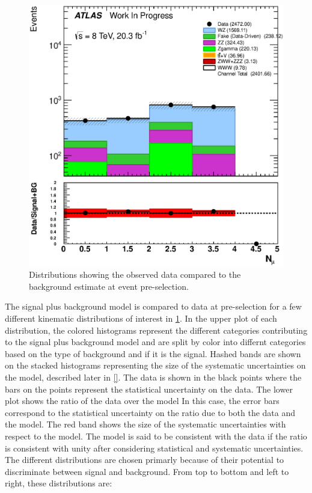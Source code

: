 \begin{figure}[ht!]
\includegraphics[width=0.3\columnwidth]{figures/appendix_signal_selection/Nov24Update_FakeSys_KFacSys_LogY_NoRebin/output/jobs/MxM/DataFull_Rates_May13_FakeRatesExactly2Loose_MuonMxMBJetGt0_ElBJetGt0SubtractPC_MxM/PreselectionNov23_15_physics/weight_all/eps/NMuons_histratio.eps}
\caption{Distributions showing the observed data compared to the background estimate at event pre-selection.}
\label{fig:preselection}
\end{figure}
The signal plus background model is compared to data at pre-selection
for a few different kinematic distributions of interest 
in \fig\ref{fig:preselection}. In the upper plot of each distribution,
the colored histograms 
represent the different categories contributing to the signal 
plus background model and 
are split by color into differnt categories based on the type of 
background and if it is the signal.  
Hashed bands are shown on the stacked
histograms representing the size of the systematic uncertainties 
on the model, described later in \sec\ref{}.
The data is shown in the black points where the 
bars on the points represent the statistical uncertainty on the data.
The lower plot shows the ratio of the data over the model
In this case, the error bars correspond to the statistical uncertainty
on the ratio due to both the data and the model. The red band
shows the size of the systematic uncertainties with respect to the model.
The model is said to be consistent with the data
if the ratio is consistent with unity after considering statistical
and systematic uncertainties.
The different distributions are chosen primarly because 
of their potential to discriminate between signal and background. 
From top to bottom and left to right,
these distributions are: 
